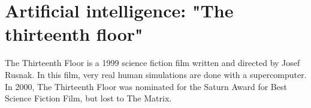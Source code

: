  
 
 
 
  
  
     
\section*{Artificial intelligence: "The thirteenth floor"} 
 The Thirteenth Floor is a 1999 science fiction film written and directed by Josef Rusnak. 
 In this film, very real human simulations are done with a supercomputer. 
 In 2000, The Thirteenth Floor was nominated for the Saturn Award for Best Science Fiction Film, but lost to The Matrix.
 
